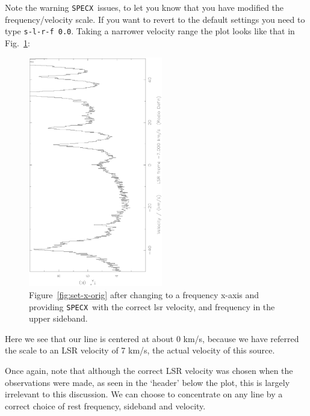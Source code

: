 \documentclass[11pt,twoside]{article}
\newcommand{\SPECX}{{\tt SPECX}}
\begin{document}
Note the warning \SPECX\ issues, to let you know that you have
modified the frequency/velocity scale. If you want to revert to the
default settings you need to type \verb|s-l-r-f 0.0|. Taking a
narrower velocity range the plot looks like that in Fig.~\ref{fig:set-to-usb}:

\begin{figure}[ht]
\begin{minipage}[t]{\textwidth}
\begin{minipage}[b]{0.5\textwidth}
\centering
\includegraphics[angle=-90,width=2.3in]{sc8_hdo-usb.ps}
\end{minipage}
\hfill
\begin{minipage}[b]{0.45\textwidth}
\caption[Part of the same in the USB]
{\small{Figure~\ref{fig:set-x-orig} after changing to a frequency
x-axis and providing \SPECX\ with the correct lsr velocity, and
frequency in the upper sideband.
\vspace*{1cm}
}}
\label{fig:set-to-usb}
\end{minipage}
\end{minipage}
\end{figure}
   
Here we see that our line is centered at about 0 km/s, because we have
referred the scale to an LSR velocity of 7 km/s, the actual velocity of
this source.

Once again, note that although the correct LSR velocity was chosen
when the observations were made, as seen in the `header' below the
plot, this is largely irrelevant to this discussion. We can choose to
concentrate on any line by a correct choice of rest frequency,
sideband and velocity. 
\end{document}
